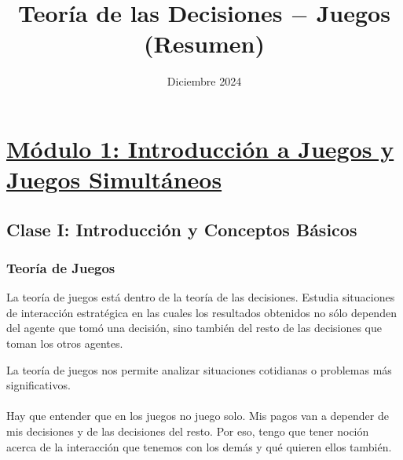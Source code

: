 \documentclass{article}
\title{Teoría de las Decisiones $-$ Juegos (Resumen)}
\date{Diciembre 2024}
\begin{document}
    \maketitle
    \thispagestyle{main} %

    \section*{\underline{Módulo 1: Introducción a Juegos y Juegos Simultáneos}}
        \subsection*{Clase I: Introducción y Conceptos Básicos}
            \subsubsection*{Teoría de Juegos}
                La teoría de juegos está dentro de la teoría de las decisiones. Estudia situaciones de interacción estratégica en las cuales los resultados obtenidos no sólo dependen del agente que tomó una decisión, sino también del resto de las decisiones que toman los otros agentes.
                
                La teoría de juegos nos permite analizar situaciones cotidianas o problemas más significativos. \\
                \\
                Hay que entender que en los juegos no juego solo. Mis pagos van a depender de mis decisiones y de las decisiones del resto. Por eso, tengo que tener noción acerca de la interacción que tenemos con los demás y qué quieren ellos también.
\end{document}
